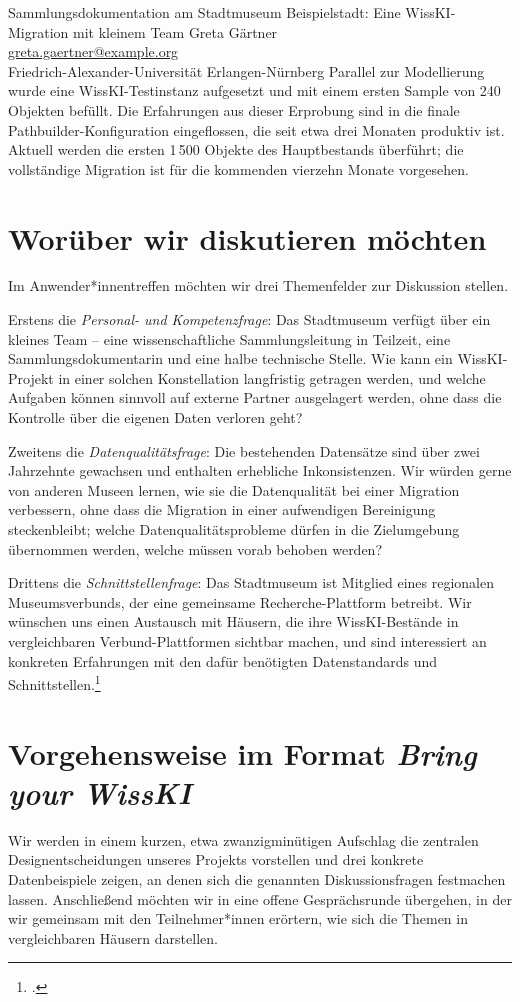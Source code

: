 \begin{beitrag}{Sammlungsdokumentation am Stadtmuseum Beispielstadt: Eine WissKI-Migration mit kleinem Team}{%
Greta Gärtner\, \\
\small \href{mailto:greta.gaertner@example.org}{greta.gaertner@example.org} \\
\small Friedrich-Alexander-Universität Erlangen-Nürnberg
}
Parallel zur Modellierung wurde eine WissKI-Testinstanz aufgesetzt und mit einem ersten Sample von 240 Objekten befüllt. Die Erfahrungen aus dieser Erprobung sind in die finale Pathbuilder-Konfiguration eingeflossen, die seit etwa drei Monaten produktiv ist. Aktuell werden die ersten 1\,500 Objekte des Hauptbestands überführt; die vollständige Migration ist für die kommenden vierzehn Monate vorgesehen.

\section{Worüber wir diskutieren möchten}
Im Anwender*innentreffen möchten wir drei Themenfelder zur Diskussion stellen.

Erstens die \emph{Personal- und Kompetenzfrage}: Das Stadtmuseum verfügt über ein kleines Team -- eine wissenschaftliche Sammlungsleitung in Teilzeit, eine Sammlungsdokumentarin und eine halbe technische Stelle. Wie kann ein WissKI-Projekt in einer solchen Konstellation langfristig getragen werden, und welche Aufgaben können sinnvoll auf externe Partner ausgelagert werden, ohne dass die Kontrolle über die eigenen Daten verloren geht?

Zweitens die \emph{Datenqualitätsfrage}: Die bestehenden Datensätze sind über zwei Jahrzehnte gewachsen und enthalten erhebliche Inkonsistenzen. Wir würden gerne von anderen Museen lernen, wie sie die Datenqualität bei einer Migration verbessern, ohne dass die Migration in einer aufwendigen Bereinigung steckenbleibt; welche Datenqualitätsprobleme dürfen in die Zielumgebung übernommen werden, welche müssen vorab behoben werden?

Drittens die \emph{Schnittstellenfrage}: Das Stadtmuseum ist Mitglied eines regionalen Museumsverbunds, der eine gemeinsame Recherche-Plattform betreibt. Wir wünschen uns einen Austausch mit Häusern, die ihre WissKI-Bestände in vergleichbaren Verbund-Plattformen sichtbar machen, und sind interessiert an konkreten Erfahrungen mit den dafür benötigten Datenstandards und Schnittstellen.\footcite[57]{gaertner2025-verbund}

\section{Vorgehensweise im Format \emph{Bring your WissKI}}
Wir werden in einem kurzen, etwa zwanzigminütigen Aufschlag die zentralen Designentscheidungen unseres Projekts vorstellen und drei konkrete Datenbeispiele zeigen, an denen sich die genannten Diskussionsfragen festmachen lassen. Anschließend möchten wir in eine offene Gesprächsrunde übergehen, in der wir gemeinsam mit den Teilnehmer*innen erörtern, wie sich die Themen in vergleichbaren Häusern darstellen.


\end{beitrag}
